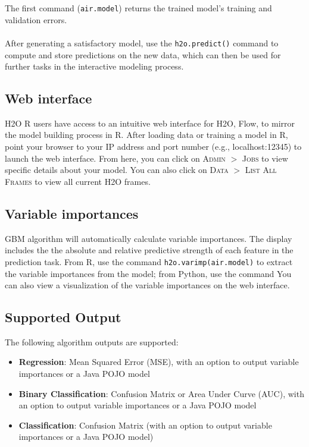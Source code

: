 \noindent
The first command ({\texttt{air.model}}) returns the trained model's training and validation errors.
\\
\\
After generating a satisfactory model, use the \texttt{h2o.predict()} command to compute and store predictions on the
new data, which can then be used for further tasks in the interactive modeling process.

\waterExampleInR


\waterExampleInPython



\subsection{Web interface}


H2O R users have access to an intuitive web interface for H2O, Flow, to mirror the model building process in R. After
loading data or training a model in R, point your browser to your IP address and port number (e.g., localhost:12345)
to launch the web interface. From here, you can click on \textsc{Admin} $>$ \textsc{Jobs} to view specific details
about your model. You can also click on \textsc{Data} $>$ \textsc{List All Frames} to view all current H2O frames.

\subsection{Variable importances}

GBM algorithm will automatically calculate variable importances. The display includes the
the absolute and relative predictive strength of each feature in the prediction task. From R, use the command \texttt{h2o.varimp(air.model)} to extract the variable importances from the model;
from Python, use the command 
You can also view a visualization of the variable
importances on the web interface.

\subsection{Supported Output}

The following algorithm outputs are supported:
\begin{itemize}
\item {\bf{Regression}}: Mean Squared Error (MSE), with an option to output variable importances or a Java POJO model
\item {\bf{Binary Classification}}: Confusion Matrix or Area Under Curve (AUC), with an option to output variable
importances or a Java POJO model
\item {\bf{Classification}}: Confusion Matrix (with an option to output variable importances or a Java POJO model)
\end{itemize}

